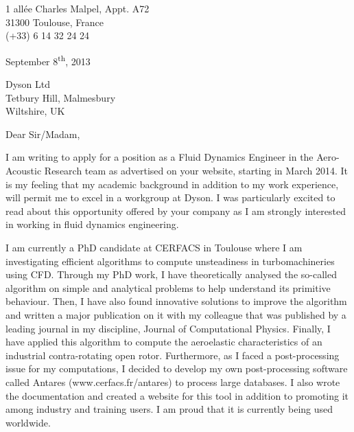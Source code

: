\documentclass[10pt]{article}
\begin{document}
\begin{flushright}
	1 allée Charles Malpel, Appt. A72 \\
	31300 Toulouse, France \\
	(+33) 6 14 32 24 24 \\
\end{flushright}

\begin{flushright}
September 8\textsuperscript{th}, 2013
\end{flushright}

\begin{flushleft}
Dyson Ltd \\
Tetbury Hill, Malmesbury \\
Wiltshire, UK
\end{flushleft}

\noindent
Dear Sir/Madam,
\newline

\noindent
I am writing to apply for a position as a Fluid Dynamics Engineer in the Aero-Acoustic Research team as advertised on your website, starting in March 2014. It is my feeling that my academic background in addition to my work experience, will permit me to excel in a workgroup at Dyson. I was particularly excited to read about this opportunity offered by your company as I am strongly interested in working in fluid dynamics engineering.
\newline

\noindent
I am currently a PhD candidate at CERFACS in Toulouse where I am investigating efficient algorithms to compute unsteadiness in turbomachineries using CFD. Through my PhD work, I have theoretically analysed the so-called algorithm on simple and analytical problems to help understand its primitive behaviour. Then, I have also found innovative solutions to improve the algorithm and written a major publication on it with my colleague that was published by a leading journal in my discipline, Journal of Computational Physics. Finally, I have applied this algorithm to compute the aeroelastic characteristics of an industrial contra-rotating open rotor. Furthermore, as I faced a post-processing issue for my computations, I decided to develop my own post-processing software called Antares (www.cerfacs.fr/antares) to process large databases. I also wrote the documentation and created a website for this tool in addition to promoting it among industry and training users. I am proud that it is currently being used worldwide.
\newline
\end{document}
